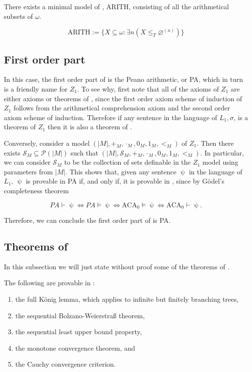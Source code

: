 \documentclass[../main.tex]{memoir}
\begin{document}
\begin{corollary}
  \label{corollary:arith-model}
  There exists a minimal model of \aca, ARITH, consisting of all the arithmetical subsets of $\omega$.

  \[ \text{ARITH} := \{X \subseteq \omega: \exists n (X \le_T \varnothing^{(n)})\} \]
\end{corollary}

\subsection{First order part}

In this case, the first order part of \aca is the Peano arithmetic, or PA, which in turn is a friendly name for $Z_1$. To see why, first note that all of the axioms of $Z_1$ are either axioms or theorems of \aca, since the first order axiom scheme of induction of $Z_1$ follows from the arithmetical comprehension axiom and the second order axiom scheme of induction. Therefore if any sentence in the language of $L_1, \sigma$, is a theorem of $Z_1$ then it is also a theorem of \aca.

Conversely, consider a model $(|M|, +_M, \cdot_M, 0_M, 1_M, <_M)$ of $Z_1$. Then there exists $\mathcal{S}_M \subseteq \mathcal{P}(|M|)$ such that $(|M|, \mathcal{S}_M, +_M, \cdot_M, 0_M, 1_M, <_M)$. In particular, we can consider $\mathcal{S}_M$ to be the collection of sets definable in the $Z_1$ model using parameters from $|M|$. This shows that, given any sentence $\uppsi$ in the language of $L_1$, $\uppsi$ is provable in PA if, and only if, it is provable in \aca, since by Gödel's completeness theorem

\[ PA \vdash \uppsi \iff PA \vDash \uppsi \iff \text{ACA}_0 \vDash \uppsi \iff \text{ACA}_0 \vdash \uppsi. \]

Therefore, we can conclude the first order part of \aca is PA.

\subsection{Theorems of \aca}

In this subsection we will just state without proof some of the theorems of \aca.

\begin{theorem}
  The following are provable in \aca:

  \begin{enumerate}
  \item the full König lemma, which applies to infinite but finitely branching trees,
  \item the sequential Bolzano-Weierstra{\ss} theorem,
  \item the sequential least upper bound property,
  \item the monotone convergence theorem, and
  \item the Cauchy convergence criterion.
  \end{enumerate}
\end{theorem}
\end{document}
